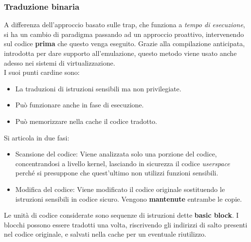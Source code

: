\documentclass{article}
\begin{document}
		\subsubsection{Traduzione binaria}
		A differenza dell'approccio basato sulle trap, che funziona a \textit{tempo di esecuzione}, si ha un cambio di paradigma passando ad un approccio proattivo, intervenendo sul codice \textbf{prima} che questo venga eseguito. 
		Grazie alla compilazione anticipata, introdotta per dare supporto all'emulazione, questo metodo viene usato anche adesso nei sistemi di virtualizzazione.\\
		I suoi punti cardine sono:
		\begin{itemize}
		    \item La traduzioni di istruzioni sensibili ma non privilegiate.
		    \item Può funzionare anche in fase di esecuzione.
		    \item Può memorizzare nella cache il codice tradotto. 
		\end{itemize}
		Si articola in due fasi:
		\begin{itemize}
		    \item Scansione del codice: Viene analizzata solo una porzione del codice, concentrandosi a livello kernel, lasciando in sicurezza il codice \emph{userspace} perché si presuppone che quest'ultimo non utilizzi funzioni sensibili.
		    \item Modifica del codice: Viene modificato il codice originale sostituendo le istruzioni sensibili in codice sicuro. Vengono \textbf{mantenute} entrambe le copie.
		\end{itemize}
		Le unità di codice considerate sono sequenze di istruzioni dette \textbf{basic block}.
		I blocchi possono essere tradotti una volta, riscrivendo gli indirizzi di salto presenti nel codice originale, e salvati nella cache per un eventuale riutilizzo.
\end{document}
